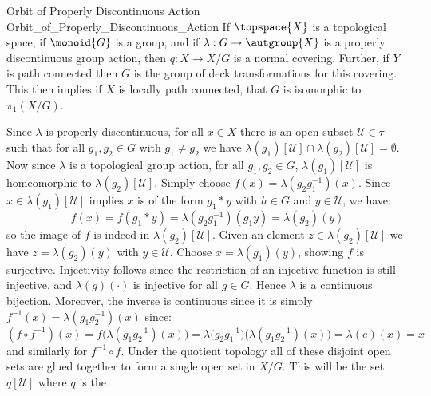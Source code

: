 \documentclass{book}                                                           %
\begin{document}
\begin{ftheorem}{Orbit of Properly Discontinuous Action}
                {Orbit_of_Properly_Discontinuous_Action}
    If $\topspace{X}$ is a topological space, if $\monoid{G}$ is a group,
    and if $\lambda:G\rightarrow\autgroup{X}$ is a properly discontinuous
    group action, then $q:X\rightarrow{X}/G$ is a normal covering. Further,
    if $Y$ is path connected then $G$ is the group of deck transformations
    for this covering. This then implies if $X$ is locally path connected,
    that $G$ is isomorphic to $\pi_{1}(X/G)$.
\end{ftheorem}
\begin{bproof}
    Since $\lambda$ is properly discontinuous, for all $x\in{X}$ there is an
    open subset $\mathcal{U}\in\tau$ such that for all $g_{1},g_{2}\in{G}$
    with $g_{1}\ne{g}_{2}$ we have
    $\lambda(g_{1})[\mathcal{U}]\cap\lambda(g_{2})[\mathcal{U}]=\emptyset$.
    Now since $\lambda$ is a topological group action, for all
    $g_{1},g_{2}\in{G}$, $\lambda(g_{1})[\mathcal{U}]$ is homeomorphic to
    $\lambda(g_{2})[\mathcal{U}]$. Simply choose
    $f(x)=\lambda(g_{2}g_{1}^{\minus{1}})(x)$. Since
    $x\in\lambda(g_{1})[\mathcal{U}]$ implies $x$ is of the form
    $g_{1}*y$ with $h\in{G}$ and $y\in\mathcal{U}$, we have:
    \begin{equation}
        f(x)=f(g_{1}*y)=\lambda(g_{2}g_{1}^{\minus{1}})(g_{1}y)
        =\lambda(g_{2})(y)
    \end{equation}
    so the image of $f$ is indeed in $\lambda(g_{2})[\mathcal{U}]$. Given an
    element $z\in\lambda(g_{2})[\mathcal{U}]$ we have $z=\lambda(g_{2})(y)$
    with $y\in\mathcal{U}$. Choose
    $x=\lambda(g_{1})(y)$, showing $f$ is surjective. Injectivity follows
    since the restriction of an injective function is still injective, and
    $\lambda(g)(\cdot)$ is injective for all $g\in{G}$. Hence $\lambda$ is a
    continuous bijection. Moreover, the inverse is continuous since it is
    simply $f^{\minus{1}}(x)=\lambda(g_{1}g_{2}^{\minus{1}})(x)$ since:
    \begin{equation}
        (f\circ{f}^{\minus{1}})(x)
        =f\big(\lambda(g_{1}g_{2}^{\minus{1}})(x)\big)
        =\lambda\big(g_{2}g_{1}^{\minus{1}}\big)
        \big(\lambda(g_{1}g_{2}^{\minus{1}})(x)\big)=\lambda(e)(x)=x
    \end{equation}
    and similarly for $f^{\minus{1}}\circ{f}$. Under the quotient topology
    all of these disjoint open sets are glued together to form a single open
    set in $X/G$. This will be the set $q[\mathcal{U}]$ where $q$ is the

\end{bproof}
\end{document}
